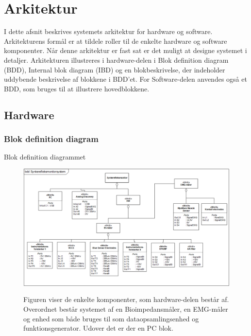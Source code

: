 \chapter{Arkitektur}

I dette afsnit beskrives systemets arkitektur for hardware og software. Arkitekturens formål er at tildele roller til de enkelte hardware og software komponenter. Når denne arkitektur er fast sat er det muligt at designe systemet i detaljer. Arkitekturen illustreres i hardware-delen i Blok definition diagram (BDD), Internal blok diagram (IBD) og en blokbeskrivelse, der indeholder uddybende beskrivelse af blokkene i BDD'et. For Software-delen anvendes også et BDD, som bruges til at illustrere hovedblokkene.

\section{Hardware}
\subsection{Blok definition diagram}

Blok definition diagrammet



\begin{figure}[H] 
\centering
{\includegraphics[width=\linewidth]
{Figure/BDD}}
\caption{Figuren viser de enkelte komponenter, som hardware-delen består af. Overordnet består
systemet af en Bioimpedansmåler, en EMG-måler og enhed som både bruges til som
dataopsamlingsenhed og funktionsgenerator. Udover det er der en PC blok.}
\label{procesVoresASE}
\end{figure}